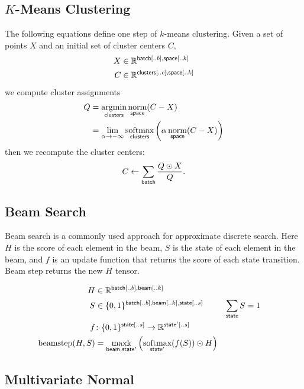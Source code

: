 \documentclass{article}
\newcommand{\reals}{\mathbb{R}}
\begin{document}
\subsection{$K$-Means Clustering}

The following equations define one step of $k$-means clustering. Given a set of points $X$ and an initial set of cluster centers $C$,
\begin{align*} 
X &\in \reals^{\nset{batch}{..b}, \nset{space}{..k}} \\
C &\in \reals^{\nset{clusters}{..c}, \nset{space}{..k}}
\end{align*}
we compute cluster assignments
\begin{align*}
Q &= \nfun{clusters}{argmin} \nfun{space}{norm}(C-X) \\
  &= \lim_{\alpha \rightarrow -\infty} \nfun{clusters}{softmax} \left(\alpha \nfun{space}{norm}(C-X)\right)
\end{align*}
then we recompute the cluster centers:
\begin{equation*}
C \leftarrow \nsum{batch} \frac{Q \odot X}{Q}.
\end{equation*}

\subsection{Beam Search}

Beam search is a commonly used approach for approximate discrete search. Here $H$ is the score of each element in the beam, $S$ is the state of each element in the beam, and $f$ is an update function that returns the score of each state transition. 
Beam step returns the new $H$ tensor. 

\begin{align*} 
H &\in \reals^{{\nset{batch}{..b}, \nset{beam}{..k}}} \\
S &\in \{0, 1\}^{{\nset{batch}{..b}, \nset{beam}{..k}, \nset{state}{..s}}} & \nsum{state} S &= 1\\
f &\colon \{0, 1\}^{{\nset{state}{..s}}} \rightarrow \reals^{{\nset{state'}{..s}}} \\ 
\text{beamstep}(H, S) &= \nfun{beam, state'}{maxk} \left( \nfun{state'}{softmax}(f(S)) \odot H \right)
\end{align*} 

\subsection{Multivariate Normal}
\end{document}
